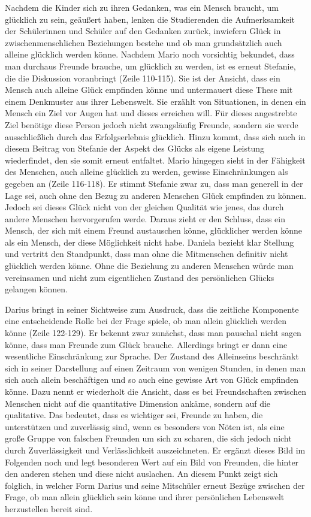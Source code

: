 Nachdem die Kinder sich zu ihren Gedanken, was ein Mensch braucht, um glücklich zu sein, geäußert haben, lenken die Studierenden die Aufmerksamkeit der Schülerinnen und Schüler auf den Gedanken zurück, inwiefern Glück in zwischenmenschlichen Beziehungen bestehe und ob man grundsätzlich auch alleine glücklich werden könne. 
Nachdem Mario noch vorsichtig bekundet, dass man durchaus Freunde brauche, um glücklich zu werden, ist es erneut Stefanie, die die Diskussion voranbringt (Zeile 110-115). 
Sie ist der Ansicht, dass ein Mensch auch alleine Glück empfinden könne und untermauert diese These mit einem Denkmuster aus ihrer Lebenswelt. 
Sie erzählt von Situationen, in denen ein Mensch ein Ziel vor Augen hat und dieses erreichen will. 
Für dieses angestrebte Ziel benötige diese Person jedoch nicht zwangsläufig Freunde, sondern sie werde ausschließlich durch das Erfolgserlebnis glücklich. 
Hinzu kommt, dass sich auch in diesem Beitrag von Stefanie der Aspekt des Glücks als eigene Leistung wiederfindet, den sie somit erneut entfaltet.
Mario hingegen sieht in der Fähigkeit des Menschen, auch alleine glücklich zu werden, gewisse Einschränkungen als gegeben an (Zeile 116-118). 
Er stimmt Stefanie zwar zu, dass man generell in der Lage sei, auch ohne den Bezug zu anderen Menschen Glück empfinden zu können. 
Jedoch sei dieses Glück nicht von der gleichen Qualität wie jenes, das durch andere Menschen hervorgerufen werde. 
Daraus zieht er den Schluss, dass ein Mensch, der sich mit einem Freund austauschen könne, glücklicher werden könne als ein Mensch, der diese Möglichkeit nicht habe. 
Daniela bezieht klar Stellung und vertritt den Standpunkt, dass man ohne die Mitmenschen definitiv nicht glücklich werden könne. 
Ohne die Beziehung zu anderen Menschen würde man vereinsamen und nicht zum eigentlichen Zustand des persönlichen Glücks gelangen können.

Darius bringt in seiner Sichtweise zum Ausdruck, dass die zeitliche Komponente eine entscheidende Rolle bei der Frage spiele, ob man allein glücklich werden könne (Zeile 122-129). 
Er bekennt zwar zunächst, dass man pauschal nicht sagen könne, dass man Freunde zum Glück brauche. 
Allerdings bringt er dann eine wesentliche Einschränkung zur Sprache. 
Der Zustand des Alleinseins beschränkt sich in seiner Darstellung auf einen Zeitraum von wenigen Stunden, in denen man sich auch allein beschäftigen und so auch eine gewisse Art von Glück empfinden könne. 
Dazu nennt er wiederholt die Ansicht, dass es bei Freundschaften zwischen Menschen nicht auf die quantitative Dimension ankäme, sondern auf die qualitative. 
Das bedeutet, dass es wichtiger sei, Freunde zu haben, die unterstützen und zuverlässig sind, wenn es besonders von Nöten ist, als eine große Gruppe von falschen Freunden um sich zu scharen, die sich jedoch nicht durch Zuverlässigkeit und Verlässlichkeit auszeichneten. 
Er ergänzt dieses Bild im Folgenden noch und legt besonderen Wert auf ein Bild von Freunden, die hinter den anderen stehen und diese nicht auslachen. 
An diesem Punkt zeigt sich folglich, in welcher Form Darius und seine Mitschüler erneut Bezüge zwischen der Frage, ob man allein glücklich sein könne und ihrer persönlichen Lebenswelt herzustellen bereit sind.

